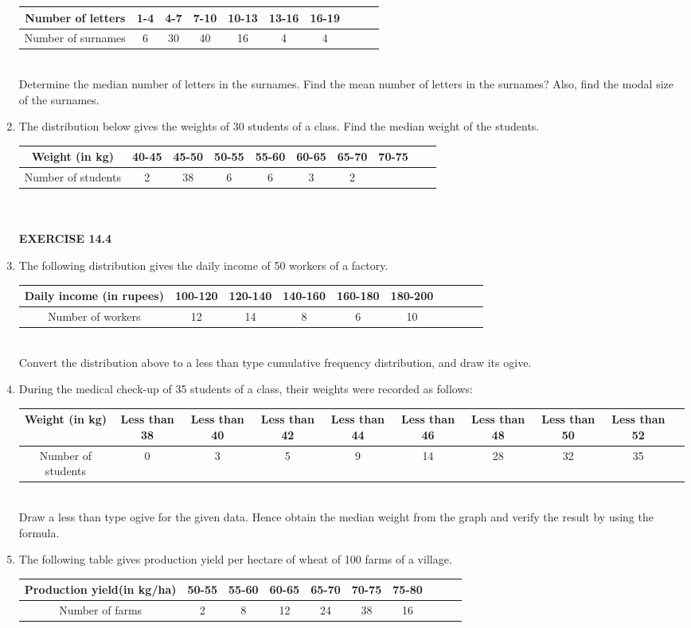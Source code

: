 \begin{enumerate}[label=\arabic*.,ref=\thesubsection.\theenumi]
\begin{tabular}{|c|c|c|c|c|c|c|c|c|c|}
\hline
Number of letters&1-4&4-7&7-10&10-13&13-16&16-19\\
\hline
Number of surnames&6&30&40&16&4&4\\
\hline
\end{tabular}\\
Determine the median number of letters in the surnames. Find the mean number of
letters in the surnames? Also, find the modal size of the surnames.
\item The distribution below gives the weights of 30 students of a class. Find the median
weight of the students.
\begin{tabular}{|c|c|c|c|c|c|c|c|c|c|}
\hline
Weight (in kg)&40-45&45-50&50-55&55-60&60-65&65-70&70-75\\
\hline
Number of students&2&38&6&6&3&2\\
\hline
\end{tabular}\\\\
{\Large \textbf{EXERCISE 14.4}}
\item The following distribution gives the daily income of 50 workers of a factory.
\begin{tabular}{|c|c|c|c|c|c|c|c|c|c|}
\hline
Daily income (in rupees)&100-120&120-140&140-160&160-180&180-200\\
\hline
Number of workers&12&14&8&6&10\\
\hline
\end{tabular}\\
Convert the distribution above to a less than type cumulative frequency distribution,
and draw its ogive.
\item During the medical check-up of 35 students of a class, their weights were recorded as
follows:
\begin{tabular}{|c|c|c|c|c|c|c|c|c|c|}
\hline
Weight (in kg)&Less than 38&Less than 40&Less than 42&Less than 44&Less than 46&Less than 48& Less than 50&Less than 52\\
\hline
Number of students&0&3&5&9&14&28&32&35\\
\hline
\end{tabular}\\
Draw a less than type ogive for the given data. Hence obtain the median weight from
the graph and verify the result by using the formula.
\item The following table gives production yield per hectare of wheat of 100 farms of a village.
\begin{tabular}{|c|c|c|c|c|c|c|c|c|c|}
\hline
Production yield(in kg/ha)&50-55&55-60&60-65&65-70&70-75&75-80
\\
\hline
Number of farms&2&8&12&24&38&16\\
\hline
\end{tabular}\\
\end{enumerate}
        
